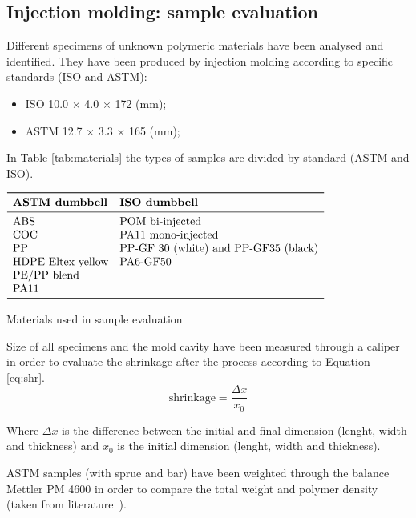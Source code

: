 \documentclass[a4paper, 11pt]{article}
\begin{document}
\newpage

\subsection{Injection molding: sample evaluation}
Different specimens of unknown polymeric materials have been analysed and identified. They have been produced by injection molding according to specific standards (ISO and ASTM):
\begin{itemize}
\item ISO 10.0 $\times$ 4.0 $\times$ 172 (mm);
\item ASTM 12.7 $\times$ 3.3 $\times$ 165 (mm);
\end{itemize}

In Table \ref{tab:materials} the types of samples are divided by standard (ASTM and ISO). 
\begin{table}[htp]
	\centering
	$
	\begin{array}{ll}
	\toprule
	\textbf{ASTM dumbbell} & \textbf{ISO dumbbell}  \\
	\midrule
	\text{ABS} & \text{POM bi-injected}\\
        \text{COC} & \text{PA11 mono-injected}\\
	\text{PP} & \text{PP-GF 30 (white) and PP-GF35 (black)}\\
	\text{HDPE Eltex yellow} & \text{PA6-GF50}\\
	\text{PE/PP blend} & \text{}\\
	\text{PA11} & \text{}\\
	\bottomrule
	\end{array}
	$
	\caption{Materials used in sample evaluation}
	\label{tab:materials}
\end{table}

Size of all specimens and the mold cavity have been measured through a caliper in order to evaluate the shrinkage after the process according to Equation \ref{eq:shr}.
\begin{equation}
\text{shrinkage} = \frac{\Delta x}{x_0}
\label{eq:shr}
\end{equation}

Where $\Delta x$ is the difference between the initial and final dimension (lenght, width and thickness) and $x_0$ is the initial dimension (lenght, width and thickness). 

ASTM samples (with sprue and bar) have been weighted through the balance Mettler PM 4600 in order to compare the total weight and polymer density (taken from literature~\cite{handbook}).
\end{document}
